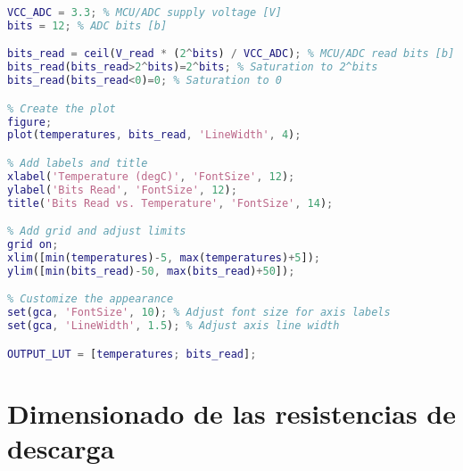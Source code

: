 \begin{lstlisting}[language=Matlab, basicstyle=\ttfamily\small, breaklines=true, frame=single]
VCC_ADC = 3.3; % MCU/ADC supply voltage [V]
bits = 12; % ADC bits [b]

bits_read = ceil(V_read * (2^bits) / VCC_ADC); % MCU/ADC read bits [b]
bits_read(bits_read>2^bits)=2^bits; % Saturation to 2^bits
bits_read(bits_read<0)=0; % Saturation to 0

% Create the plot
figure;
plot(temperatures, bits_read, 'LineWidth', 4);

% Add labels and title
xlabel('Temperature (degC)', 'FontSize', 12);
ylabel('Bits Read', 'FontSize', 12);
title('Bits Read vs. Temperature', 'FontSize', 14);

% Add grid and adjust limits
grid on;
xlim([min(temperatures)-5, max(temperatures)+5]);
ylim([min(bits_read)-50, max(bits_read)+50]);

% Customize the appearance
set(gca, 'FontSize', 10); % Adjust font size for axis labels
set(gca, 'LineWidth', 1.5); % Adjust axis line width

OUTPUT_LUT = [temperatures; bits_read];

\end{lstlisting}

\section{Dimensionado de las resistencias de descarga}

